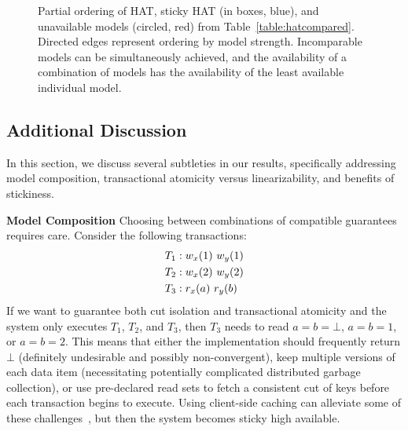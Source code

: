 \begin{figure}[t!]
\label{fig:hat-order}
\caption{Partial ordering of HAT, sticky HAT (in boxes, blue), and
  unavailable models (circled, red) from
  Table~\protect\ref{table:hatcompared}. Directed edges represent
  ordering by model strength. Incomparable models can be
  simultaneously achieved, and the availability of a combination of
  models has the availability of the least available individual
  model.}
\label{fig:hatcompared}
\end{figure}


\subsection{Additional Discussion}
\label{sec:discussion}

In this section, we discuss several subtleties in our results,
specifically addressing model composition, transactional atomicity
versus linearizability, and benefits of stickiness.

\vspace{.5em}\noindent\textbf{Model Composition} Choosing between
combinations of compatible guarantees requires care. Consider the
following transactions:
\begin{align*}
\small\vspace{-.5em}
T_1 &: w_x(1)~w_y(1)
\\T_2 &: w_x(2)~w_y(2)
\\T_3 &: r_x(a)~r_y(b)\vspace{-.5em}
\end{align*}
If we want to guarantee both cut isolation and transactional atomicity
and the system only executes $T_1$, $T_2$, and $T_3$, then $T_3$ needs
to read $a=b=\bot$, $a=b=1$, or $a=b=2$. This means that either the
implementation should frequently return $\bot$ (definitely undesirable
and possibly non-convergent), keep multiple versions of each data item
(necessitating potentially complicated distributed garbage
collection), or use pre-declared read sets to fetch a consistent cut
of keys before each transaction begins to execute. Using client-side
caching can alleviate some of these challenges~\cite{bolton, swift},
but then the system becomes sticky high available.

